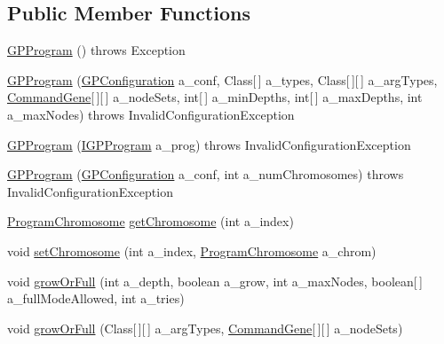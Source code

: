 \subsection*{Public Member Functions}
\begin{DoxyCompactItemize}
\item 
\hyperlink{classorg_1_1jgap_1_1gp_1_1impl_1_1_g_p_program_a59b54758ea429255b3808ed4d382e3e8}{G\-P\-Program} ()  throws Exception 
\item 
\hyperlink{classorg_1_1jgap_1_1gp_1_1impl_1_1_g_p_program_a0c734a54d887f41910bd7dcefca615d6}{G\-P\-Program} (\hyperlink{classorg_1_1jgap_1_1gp_1_1impl_1_1_g_p_configuration}{G\-P\-Configuration} a\-\_\-conf, Class\mbox{[}$\,$\mbox{]} a\-\_\-types, Class\mbox{[}$\,$\mbox{]}\mbox{[}$\,$\mbox{]} a\-\_\-arg\-Types, \hyperlink{classorg_1_1jgap_1_1gp_1_1_command_gene}{Command\-Gene}\mbox{[}$\,$\mbox{]}\mbox{[}$\,$\mbox{]} a\-\_\-node\-Sets, int\mbox{[}$\,$\mbox{]} a\-\_\-min\-Depths, int\mbox{[}$\,$\mbox{]} a\-\_\-max\-Depths, int a\-\_\-max\-Nodes)  throws Invalid\-Configuration\-Exception 
\item 
\hyperlink{classorg_1_1jgap_1_1gp_1_1impl_1_1_g_p_program_ac145944c5fa1f02adf15d163c75cd741}{G\-P\-Program} (\hyperlink{interfaceorg_1_1jgap_1_1gp_1_1_i_g_p_program}{I\-G\-P\-Program} a\-\_\-prog)  throws Invalid\-Configuration\-Exception 
\item 
\hyperlink{classorg_1_1jgap_1_1gp_1_1impl_1_1_g_p_program_a2f1006256565e614a036088e512f666e}{G\-P\-Program} (\hyperlink{classorg_1_1jgap_1_1gp_1_1impl_1_1_g_p_configuration}{G\-P\-Configuration} a\-\_\-conf, int a\-\_\-num\-Chromosomes)  throws Invalid\-Configuration\-Exception 
\item 
\hyperlink{classorg_1_1jgap_1_1gp_1_1impl_1_1_program_chromosome}{Program\-Chromosome} \hyperlink{classorg_1_1jgap_1_1gp_1_1impl_1_1_g_p_program_a52e5cbf2e5421994f5139abdc8f97633}{get\-Chromosome} (int a\-\_\-index)
\item 
void \hyperlink{classorg_1_1jgap_1_1gp_1_1impl_1_1_g_p_program_a3681ad93308a4dfe0da29a55a7a66ab2}{set\-Chromosome} (int a\-\_\-index, \hyperlink{classorg_1_1jgap_1_1gp_1_1impl_1_1_program_chromosome}{Program\-Chromosome} a\-\_\-chrom)
\item 
void \hyperlink{classorg_1_1jgap_1_1gp_1_1impl_1_1_g_p_program_afa3deae00dc713972f745187b993c5f0}{grow\-Or\-Full} (int a\-\_\-depth, boolean a\-\_\-grow, int a\-\_\-max\-Nodes, boolean\mbox{[}$\,$\mbox{]} a\-\_\-full\-Mode\-Allowed, int a\-\_\-tries)
\item 
void \hyperlink{classorg_1_1jgap_1_1gp_1_1impl_1_1_g_p_program_a8fc60fba88931109b56a9bf355bbf863}{grow\-Or\-Full} (Class\mbox{[}$\,$\mbox{]}\mbox{[}$\,$\mbox{]} a\-\_\-arg\-Types, \hyperlink{classorg_1_1jgap_1_1gp_1_1_command_gene}{Command\-Gene}\mbox{[}$\,$\mbox{]}\mbox{[}$\,$\mbox{]} a\-\_\-node\-Sets)

\end{DoxyCompactItemize}
